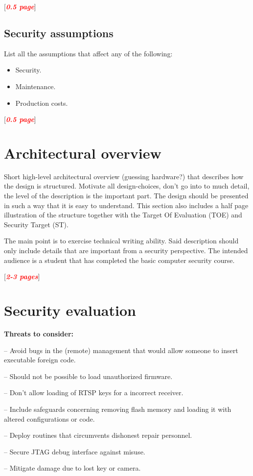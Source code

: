 \documentclass[10pt]{article}
\newcommand{\comm}[1]{{\leavevmode\color{gray}#1}}
\newcommand{\todo}[1]{
  \begin{center}
    [\textcolor{red}{\textbf{\textit{#1}}}]
  \end{center}
}
\newenvironment{checklist}{%
  \begin{list}{}{}%
  \let\olditem\item
  \renewcommand\item{\olditem -- \marginpar{$\Box$} }
  \newcommand\checkeditem{\olditem -- \marginpar{$\CheckedBox$} }
}{%
  \end{list}
}
\begin{document}
    \todo{0.5 page}

    \subsection{Security assumptions}

      \comm{
        List all the assumptions that affect any of the following:
        \begin{itemize}
          \item{Security.}
          \item{Maintenance.}
          \item{Production costs.}
        \end{itemize}
      }

      \todo{0.5 page}

  \section{Architectural overview}

    \comm{%
      Short high-level architectural overview (guessing hardware?) that
      describes how the design is structured. Motivate all design-choices,
      don't go into to much detail, the level of the description is the
      important part. The design should be presented in such a way that it is
      easy to understand. This section also includes a half page illustration
      of the structure together with the Target Of Evaluation (TOE) and
      Security Target (ST).

      The main point is to exercise technical writing ability. Said description
      should only include details that are important from a security
      perspective. The intended audience is a student that has completed the
      basic computer security course.
    }

    \todo{2-3 pages}

  \section{Security evaluation}

  \textbf{Threats to consider:}
  \begin{checklist}
    \item{Avoid bugs in the (remote) management that would allow someone to
      insert executable foreign code.}
    \item{Should not be possible to load unauthorized firmware.}
    \item{Don't allow loading of RTSP keys for a incorrect receiver.}
    \item{Include safeguards concerning removing flash memory and loading it
      with altered configurations or code.}
    \item{Deploy routines that circumvents dishonest repair personnel.}
    \item{Secure JTAG debug interface against misuse.}
    \item{Mitigate damage due to lost key or camera.}
  \end{checklist}
\end{document}
